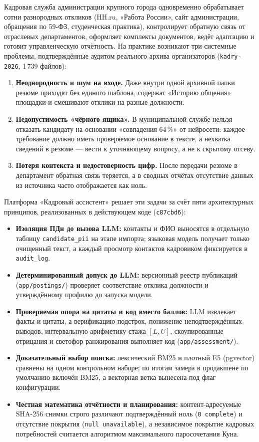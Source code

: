 \documentclass[10pt,a4paper,twocolumn]{article}
\newcommand{\code}[1]{\texttt{#1}}
\begin{document}
Кадровая служба администрации крупного города одновременно обрабатывает сотни разнородных
откликов (HH.ru, «Работа России», сайт администрации, обращения по 59-ФЗ, студенческая практика),
контролирует обратную связь от отраслевых департаментов, оформляет комплекты документов, ведёт
адаптацию и готовит управленческую отчётность. На практике возникают три системные проблемы,
подтверждённые аудитом реального архива организаторов (\code{kadry-2026}, 1\,739 файлов):
\begin{enumerate}
  \item \textbf{Неоднородность и шум на входе.} Даже внутри одной архивной папки резюме
    приходят без единого шаблона, содержат «Историю общения» площадки и смешивают отклики на
    разные должности.
  \item \textbf{Недопустимость «чёрного ящика».} В муниципальной службе нельзя отказать
    кандидату на основании «совпадения 64\,\%» от нейросети: каждое требование должно иметь
    проверяемое основание в тексте, а нехватка сведений в резюме — вести к уточняющему вопросу,
    а не к скрытому отсеву.
  \item \textbf{Потеря контекста и недостоверность цифр.} После передачи резюме в департамент
    обратная связь теряется, а в сводных отчётах отсутствие данных из источника часто
    отображается как ноль.
\end{enumerate}

Платформа «Кадровый ассистент» решает эти задачи за счёт пяти архитектурных принципов,
реализованных в действующем коде (\code{c87cbd6}):
\begin{itemize}
  \item \textbf{Изоляция ПДн до вызова LLM:} контакты и ФИО выносятся в отдельную таблицу
    \code{candidate\_pii} на этапе импорта; языковая модель получает только очищенный текст,
    а каждый просмотр контактов кадровиком фиксируется в \code{audit\_log}.
  \item \textbf{Детерминированный допуск до LLM:} версионный реестр публикаций
    (\code{app/postings/}) проверяет соответствие отклика должности и утверждённому профилю
    до запуска модели.
  \item \textbf{Проверяемая опора на цитаты и код вместо баллов:} LLM извлекает факты и цитаты,
    а верификацию подстрок, понижение неподтверждённых выводов, интервальную арифметику стажа
    $[L, U]$, скоупированные отрицания и светофор ранжирования выполняет код
    (\code{app/assessment/}).
  \item \textbf{Доказательный выбор поиска:} лексический BM25 и плотный E5 (pgvector) сравнены
    на одном контрольном наборе; по итогам замера в продакшене по умолчанию включён BM25, а
    векторная ветка вынесена под флаг конфигурации.
  \item \textbf{Честная математика отчётности и планирования:} контент-адресуемые SHA-256
    снимки строго различают подтверждённый ноль (\code{0 complete}) и отсутствие покрытия
    (\code{null unavailable}), а независимое покрытие кадровых потребностей считается алгоритмом
    максимального паросочетания Куна.
\end{itemize}
\end{document}
